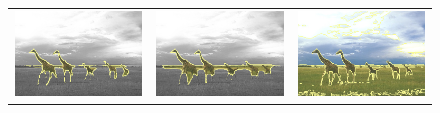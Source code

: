 \documentclass[runningheads]{llncs}
\begin{document}
\begin{figure}
\begin{tabular}{ccc}
		\includegraphics[scale=0.2]{images/segmentation/bc/giraffes/gc-seg.png} &
		\includegraphics[scale=0.2]{images/segmentation/bc/giraffes/corrected-seg.png} &					\includegraphics[scale=0.2]{images/segmentation/schoenemann/giraffes/giraffes-seg.png}\\

\end{tabular}
\end{figure}
\end{document}
